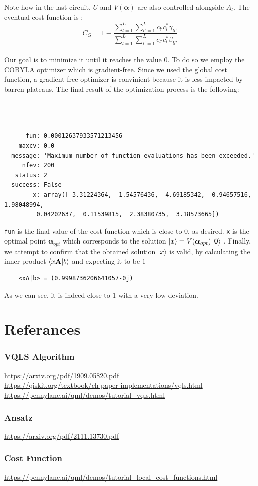 \documentclass[12pt]{article}
\begin{document}
Note how in the last circuit, $U$ and $V({\boldsymbol{ \alpha}})$ are also controlled alongside $A_l$. The eventual cost function is :
 $$ C_G = 1 - \frac{\sum_{l = 1}^{L}\sum_{l' = 1}^{L}c_{l'} c_l^* \gamma_{ll'}}
 {\sum_{l = 1}^{L}\sum_{l' = 1}^{L}c_{l'} c_l^* \beta_{ll'}} $$\\
Our goal is to minimize it until it reaches the value $0$. To do so we employ the COBYLA optimizer which is gradient-free. Since we used the global cost function, a gradient-free optimizer 
is convinient because it is less impacted by barren plateaus. The final result of the optimization process is the following:\\ \\ \\ \\  
\begin{verbatim}
      fun: 0.00012637933571213456
    maxcv: 0.0
  message: 'Maximum number of function evaluations has been exceeded.'
     nfev: 200
   status: 2
  success: False
        x: array([ 3.31224364,  1.54576436,  4.69185342, -0.94657516,  1.98048994,
         0.04202637,  0.11539815,  2.38380735,  3.18573665])
\end{verbatim}
\verb{fun{ is the final value of the cost function which is close to $0$, as desired. 
\verb{x{ is the optimal point $\boldsymbol{\alpha}_{opt} $ which corresponds to the solution $\ket{x} = V(\boldsymbol{\alpha}_{opt})\ket{\bf 0}$ .
Finally, we attempt to confirm that the obtained solution $\ket{x}$ is valid, by calculating the inner product $\braket{x{\bf A}|b}$ and expecting it to be $1$ 
\begin{verbatim}
    <xA|b> = (0.9998736206641057-0j)
\end{verbatim}    
As we can see, it is indeed close to $1$ with a very low deviation.

\section*{Referances}
\subsubsection*{VQLS Algorithm}
\url{https://arxiv.org/pdf/1909.05820.pdf}\\
\url{https://qiskit.org/textbook/ch-paper-implementations/vqls.html}\\
\url{https://pennylane.ai/qml/demos/tutorial_vqls.html}

\subsubsection*{Ansatz}
\url{https://arxiv.org/pdf/2111.13730.pdf}

\subsubsection*{Cost Function}
\url{https://pennylane.ai/qml/demos/tutorial_local_cost_functions.html}
\end{document}

